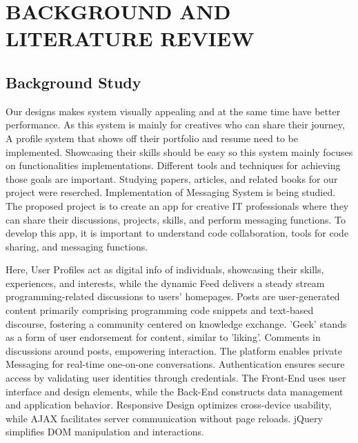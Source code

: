 \chapter{BACKGROUND AND LITERATURE REVIEW}





\section{Background Study}

Our designs makes system visually appealing and at the same time have better performance. As this system is mainly for creatives who can share their journey, A profile system that shows off their portfolio and resume need to be implemented. Showcasing their skills should be easy so this system mainly focuses on functionalities implementations. Different tools and techniques for achieving those goals are important. Studying papers, articles, and related books for our project were reserched. Implementation of Messaging System is being studied.
The proposed project is to create an app for creative IT professionals where they can share their discussions, projects, skills, and perform messaging functions. To develop this app, it is important to understand code collaboration, tools for code sharing, and messaging functions.

Here, User Profiles act as digital info of individuals, showcasing their skills, experiences, and interests, while the dynamic Feed delivers a steady stream programming-related discussions to users' homepages. Posts are user-generated content primarily comprising programming code snippets and text-based discourse, fostering a community centered on knowledge exchange. 'Geek' stands as a form of user endorsement for content, similar to 'liking'. Comments in discussions around posts, empowering interaction. The platform enables private Messaging for real-time one-on-one conversations. Authentication ensures secure access by validating user identities through credentials. The Front-End uses user interface and design elements, while the Back-End constructs data management and application behavior. Responsive Design optimizes cross-device usability, while AJAX facilitates server communication without page reloads. jQuery simplifies DOM manipulation and interactions.

